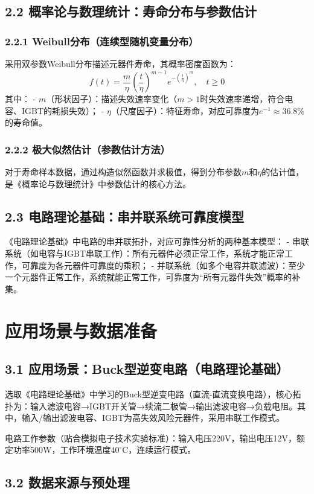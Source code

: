 \documentclass{article}
\begin{document}
\subsection*{2.2 概率论与数理统计：寿命分布与参数估计}
\subsubsection*{2.2.1 Weibull分布（连续型随机变量分布）}
采用双参数Weibull分布描述元器件寿命，其概率密度函数为：
\[
f(t) = \frac{m}{\eta} \left( \frac{t}{\eta} \right)^{m-1} e^{-\left( \frac{t}{\eta} \right)^m}, \quad t \geq 0
\]
其中：
- $m$（形状因子）：描述失效速率变化（$m>1$时失效速率递增，符合电容、IGBT的耗损失效）；
- $\eta$（尺度因子）：特征寿命，对应可靠度为$e^{-1}\approx36.8\%$的寿命值。

\subsubsection*{2.2.2 极大似然估计（参数估计方法）}
对于寿命样本数据，通过构造似然函数并求极值，得到分布参数$m$和$\eta$的估计值，是《概率论与数理统计》中参数估计的核心方法。

\subsection*{2.3 电路理论基础：串并联系统可靠度模型}
《电路理论基础》中电路的串并联拓扑，对应可靠性分析的两种基本模型：
- 串联系统（如电容与IGBT串联工作）：所有元器件必须正常工作，系统才能正常工作，可靠度为各元器件可靠度的乘积；
- 并联系统（如多个电容并联滤波）：至少一个元器件正常工作，系统就能正常工作，可靠度为“所有元器件失效”概率的补集。


\section*{应用场景与数据准备}
\subsection*{3.1 应用场景：Buck型逆变电路（电路理论基础）}
选取《电路理论基础》中学习的Buck型逆变电路（直流-直流变换电路），核心拓扑为：输入滤波电容→IGBT开关管→续流二极管→输出滤波电容→负载电阻。其中，输入/输出滤波电容、IGBT为高失效风险元器件，采用串联工作模式。

电路工作参数（贴合模拟电子技术实验标准）：输入电压220V，输出电压12V，额定功率500W，工作环境温度$40^\circ\text{C}$，连续运行模式。

\subsection*{3.2 数据来源与预处理}
\end{document}
